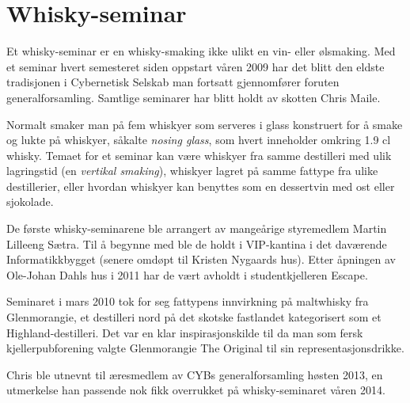 \chapter{Whisky-seminar}

\author{Skrevet av Torgeir Lebesbye}

Et whisky-seminar er en whisky-smaking ikke ulikt en vin- eller ølsmaking. Med et seminar hvert semesteret siden oppstart våren 2009 har det blitt den eldste tradisjonen i Cybernetisk Selskab man fortsatt gjennomfører foruten generalforsamling. Samtlige seminarer har blitt holdt av skotten Chris Maile.

Normalt smaker man på fem whiskyer som serveres i glass konstruert for å smake og lukte på whiskyer, såkalte \textit{nosing glass}, som hvert inneholder omkring 1.9 cl whisky. Temaet for et seminar kan være whiskyer fra samme destilleri med ulik lagringstid (en \textit{vertikal smaking}), whiskyer lagret på samme fattype fra ulike destillerier, eller hvordan whiskyer kan benyttes som en dessertvin med ost eller sjokolade.

De første whisky-seminarene ble arrangert av mangeårige styremedlem Martin Lilleeng Sætra. Til å begynne med ble de holdt i VIP-kantina i det daværende Informatikkbygget (senere omdøpt til Kristen Nygaards hus). Etter åpningen av Ole-Johan Dahls hus i 2011 har de vært avholdt i studentkjelleren Escape.

Seminaret i mars 2010 tok for seg fattypens innvirkning på maltwhisky fra Glenmorangie, et destilleri nord på det skotske fastlandet kategorisert som et Highland-destilleri. Det var en klar inspirasjonskilde til da man som fersk kjellerpubforening valgte Glenmorangie The Original til sin representasjonsdrikke.

Chris ble utnevnt til æresmedlem av CYBs generalforsamling høsten 2013, en utmerkelse han passende nok fikk overrukket på whisky-seminaret våren 2014.